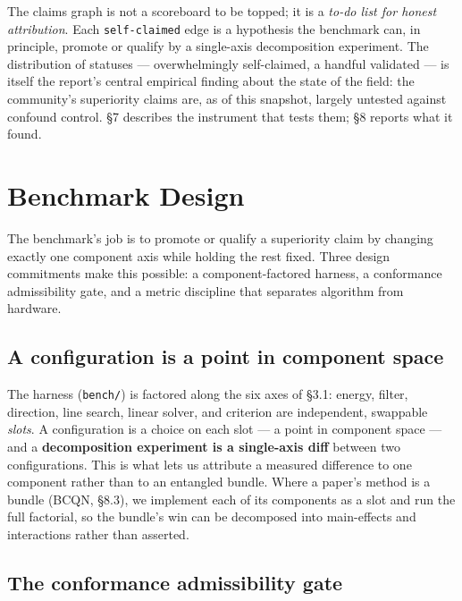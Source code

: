 \documentclass{egpubl}
\begin{document}
The claims graph is not a scoreboard to be topped; it is a \emph{to-do list for honest attribution}. Each
\texttt{self-claimed} edge is a hypothesis the benchmark can, in principle, promote or qualify by a
single-axis decomposition experiment. The distribution of statuses --- overwhelmingly self-claimed, a
handful validated --- is itself the report's central empirical finding about the state of the field:
the community's superiority claims are, as of this snapshot, largely untested against confound
control. \S7 describes the instrument that tests them; \S8 reports what it found.


\section{Benchmark Design}

The benchmark's job is to promote or qualify a superiority claim by changing exactly one component
axis while holding the rest fixed. Three design commitments make this possible: a component-factored
harness, a conformance admissibility gate, and a metric discipline that separates algorithm from
hardware.

\subsection{A configuration is a point in component space}

The harness (\texttt{bench/}) is factored along the six axes of \S3.1: energy, filter, direction, line search,
linear solver, and criterion are independent, swappable \emph{slots}. A configuration is a choice on each
slot --- a point in component space --- and a \textbf{decomposition experiment is a single-axis diff} between
two configurations. This is what lets us attribute a measured difference to one component rather than
to an entangled bundle. Where a paper's method is a bundle (BCQN, \S8.3), we implement each of its
components as a slot and run the full factorial, so the bundle's win can be decomposed into
main-effects and interactions rather than asserted.

\subsection{The conformance admissibility gate}
\end{document}
